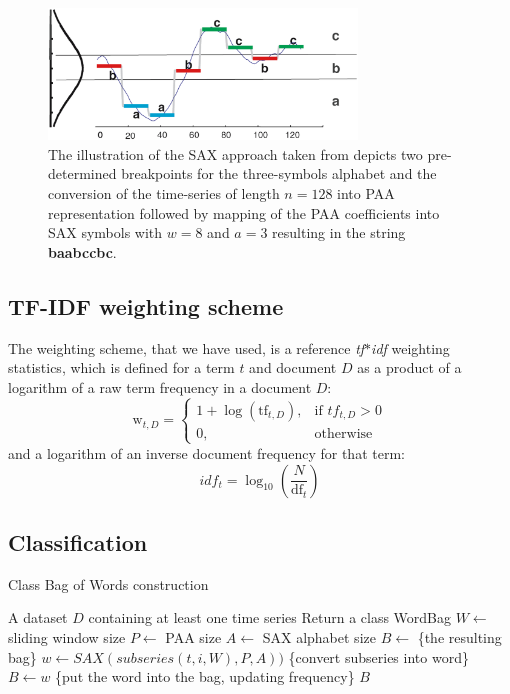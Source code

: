 \documentclass{llncs}
\begin{document}
\begin{figure}[tb]
   \centering
   \includegraphics[height=35mm]{figures/sax_intro.eps}
   \caption{The illustration of the SAX approach taken from \cite{sax} depicts 
    two pre-determined breakpoints for the three-symbols alphabet and the conversion of the time-series of 
    length $n=128$ into PAA representation followed by mapping of the PAA coefficients into SAX symbols with 
    $w=8$ and $a=3$ resulting in the string \textbf{baabccbc}.}
   \label{fig:sax_intro}
\end{figure}

\subsection{TF-IDF weighting scheme} \label{tfidf}
The weighting scheme, that we have used, is a reference \textit{tf$\ast$idf} weighting statistics,
which is defined for a term $t$ and document $D$ 
as a product of a logarithm of a raw term frequency in a document $D$:
\begin{equation}
 \mbox{w}_{t, D} =  \begin{cases} 1 + \log(\mbox{tf}_{t,D}), & \mbox{if } tf_{t,D}>0  \\ 0, & \mbox{otherwise } \end{cases}
\end{equation} 
and a logarithm of an inverse document frequency for that term:
\begin{equation}
 idf_{t} =  \log_{10}(\frac{N}{\mbox{df}_{t}})
\end{equation} 


\subsection{Classification} \label{sax}
\begin{algorithm}
\caption{Class Bag of Words construction}
\label{alg1}
\begin{algorithmic}[1]
\REQUIRE A dataset $D$ containing at least one time series
\ENSURE Return a class WordBag
\STATE $W \leftarrow$ sliding window size
\STATE $P \leftarrow$ PAA size
\STATE $A \leftarrow$ SAX alphabet size
\STATE $B \leftarrow$ \{the resulting bag\}
 \STATE $w \leftarrow SAX(subseries(t,i,W), P, A))$ \{convert subseries into word\}
 \STATE $B \leftarrow w$ \{put the word into the bag, updating frequency\}
 \ENDFOR
\ENDFOR
\RETURN $B$
\end{algorithmic}
\end{algorithm}
\end{document}
